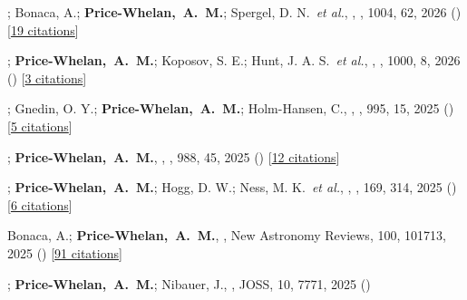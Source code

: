 \item[{\color{deemph}\scriptsize19}]; Bonaca, A.; \textbf{Price-Whelan,~A.~M.}; Spergel, D. N.~\textit{et al.}, , \apj, 1004, 62, 2026 () [\href{http://adsabs.harvard.edu/abs/2026ApJ..1004...62N}{19 citations}]

\item[{\color{deemph}\scriptsize18}]; \textbf{Price-Whelan,~A.~M.}; Koposov, S. E.; Hunt, J. A. S.~\textit{et al.}, , \apj, 1000, 8, 2026 () [\href{http://adsabs.harvard.edu/abs/2026ApJ..1000....8H}{3 citations}]

\item[{\color{deemph}\scriptsize17}]; Gnedin, O. Y.; \textbf{Price-Whelan,~A.~M.}; Holm-Hansen, C., , \apj, 995, 15, 2025 () [\href{http://adsabs.harvard.edu/abs/2025ApJ...995...15C}{5 citations}]

\item[{\color{deemph}\scriptsize16}]; \textbf{Price-Whelan,~A.~M.}, , \apj, 988, 45, 2025 () [\href{http://adsabs.harvard.edu/abs/2025ApJ...988...45T}{12 citations}]

\item[{\color{deemph}\scriptsize15}]; \textbf{Price-Whelan,~A.~M.}; Hogg, D. W.; Ness, M. K.~\textit{et al.}, , \aj, 169, 314, 2025 () [\href{http://adsabs.harvard.edu/abs/2025AJ....169..314H}{6 citations}]

\item[{\color{deemph}\scriptsize14}]Bonaca, A.; \textbf{Price-Whelan,~A.~M.}, , New Astronomy Reviews, 100, 101713, 2025 () [\href{http://adsabs.harvard.edu/abs/2025NewAR.10001713B}{91 citations}]

\item[{\color{deemph}\scriptsize13}]; \textbf{Price-Whelan,~A.~M.}; Nibauer, J., , JOSS, 10, 7771, 2025 ()

